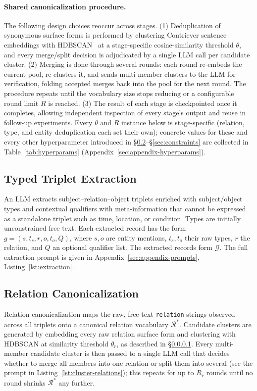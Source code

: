 \documentclass[11pt]{article}
\begin{document}
\paragraph{Shared canonicalization procedure.}
\label{sec:reoccurring-design}
The following design choices reoccur across stages. (1) Deduplication of synonymous surface forms is performed by clustering Contriever sentence embeddings \citep{izacard2022contriever} with HDBSCAN~\citep{campello2013hdbscan} at a stage-specific cosine-similarity threshold $\theta$, and every merge/split decision is adjudicated by a single LLM call per candidate cluster. (2) Merging is done through several rounds: each round re-embeds the current pool, re-clusters it, and sends multi-member clusters to the LLM for verification, folding accepted merges back into the pool for the next round. The procedure repeats until the vocabulary size stops reducing or a configurable round limit $R$ is reached. (3) The result of each stage is checkpointed once it completes, allowing independent inspection of every stage's output and reuse in follow-up experiments. Every $\theta$ and $R$ instance below is stage-specific (relation, type, and entity deduplication each set their own); concrete values for these and every other hyperparameter introduced in \S\ref{sec:relation-dedup}--\S\ref{sec:constraints} are collected in Table~\ref{tab:hyperparams} (Appendix~\ref{sec:appendix-hyperparams}).

\subsection{Typed Triplet Extraction}
\label{sec:extraction}
An LLM extracts subject--relation--object triplets enriched with subject/object types and contextual qualifiers with meta-information that cannot be expressed as a standalone triplet such as time, location, or condition. Types are initially unconstrained free text. Each extracted record has the form $g=(s,t_s,r,o,t_o,Q)$, where $s,o$ are entity mentions, $t_s,t_o$ their raw types, $r$ the relation, and $Q$ an optional qualifier list. The extracted records form $\mathcal{G}$. The full extraction prompt is given in Appendix~\ref{sec:appendix-prompts}, Listing~\ref{lst:extraction}.

\subsection{Relation Canonicalization}
\label{sec:relation-dedup}

Relation canonicalization maps the raw, free-text \texttt{relation} strings observed across all triplets onto a canonical relation vocabulary
$\mathcal{R}^*$. Candidate clusters are generated by embedding every raw
relation surface form and clustering with HDBSCAN at similarity threshold
$\theta_r$, as described in \S\ref{sec:reoccurring-design}. Every multi-member candidate cluster is then passed to a single LLM call that decides whether to merge all members into one relation or split them into several (see the prompt in Listing~\ref{lst:cluster-relations}); this repeats for up to $R_r$ rounds until no round shrinks $\mathcal{R}^*$ any further.
\end{document}
